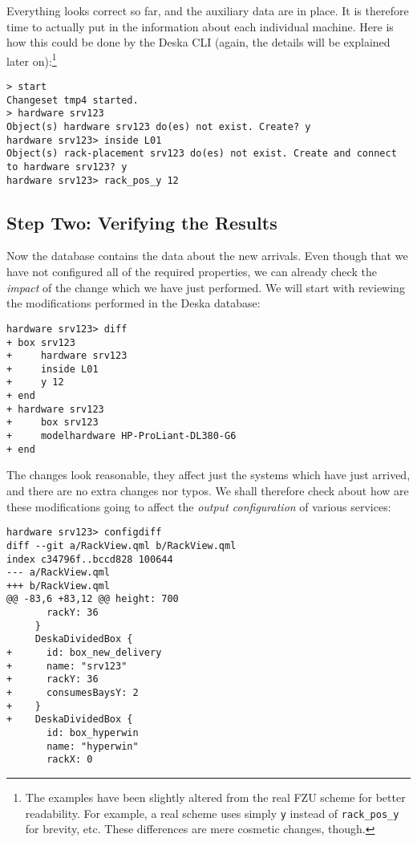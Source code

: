 \documentclass[deska]{subfiles}
\begin{document}
Everything looks correct so far, and the auxiliary data are in place.  It is therefore time to actually put in the
information about each individual machine.  Here is how this could be done by the Deska CLI (again, the details will be
explained later on):\footnote{The examples have been slightly altered from the real FZU scheme for better readability.
For example, a real scheme uses simply {\tt y} instead of {\tt rack\_pos\_y} for brevity, etc.  These differences are
mere cosmetic changes, though.}

\begin{verbatim}
> start
Changeset tmp4 started.
> hardware srv123
Object(s) hardware srv123 do(es) not exist. Create? y
hardware srv123> inside L01
Object(s) rack-placement srv123 do(es) not exist. Create and connect to hardware srv123? y
hardware srv123> rack_pos_y 12
\end{verbatim}

\subsection{Step Two: Verifying the Results}

Now the database contains the data about the new arrivals.  Even though that we have not configured all of the required
properties, we can already check the {\em impact} of the change which we have just performed.  We will start with
reviewing the modifications performed in the Deska database:

\begin{verbatim}
hardware srv123> diff
+ box srv123
+     hardware srv123
+     inside L01
+     y 12
+ end
+ hardware srv123
+     box srv123
+     modelhardware HP-ProLiant-DL380-G6
+ end
\end{verbatim}

The changes look reasonable, they affect just the systems which have just arrived, and there are no extra changes nor
typos.  We shall therefore check about how are these modifications going to affect the {\em output configuration} of
various services:

\begin{verbatim}
hardware srv123> configdiff
diff --git a/RackView.qml b/RackView.qml
index c34796f..bccd828 100644
--- a/RackView.qml
+++ b/RackView.qml
@@ -83,6 +83,12 @@ height: 700
       rackY: 36
     }
     DeskaDividedBox {
+      id: box_new_delivery
+      name: "srv123"
+      rackY: 36
+      consumesBaysY: 2
+    }
+    DeskaDividedBox {
       id: box_hyperwin
       name: "hyperwin"
       rackX: 0
\end{verbatim}
\end{document}

